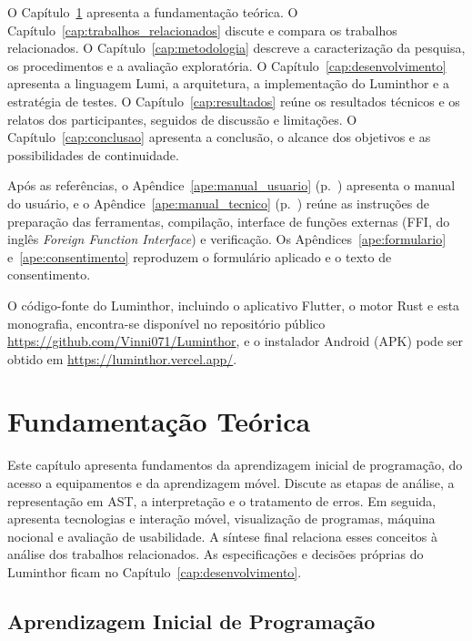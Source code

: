 \documentclass[
    12pt
    ,oneside
    ,a4paper
    ,chapter=TITLE
    ,section=TITLE
    ,sumario=abnt-6027-2012]{abntex2}
\begin{document}
O Capítulo~\ref{cap:fundamentacao} apresenta a fundamentação teórica.
O Capítulo~\ref{cap:trabalhos_relacionados} discute e compara os trabalhos
relacionados. O Capítulo~\ref{cap:metodologia} descreve a caracterização da
pesquisa, os procedimentos e a avaliação exploratória. O
Capítulo~\ref{cap:desenvolvimento} apresenta a linguagem Lumi, a arquitetura,
a implementação do Luminthor e a estratégia de testes.
O Capítulo~\ref{cap:resultados} reúne os resultados técnicos e os relatos dos
participantes, seguidos de discussão e limitações.
O Capítulo~\ref{cap:conclusao} apresenta a conclusão, o alcance dos objetivos
e as possibilidades de continuidade.

Após as referências, o Apêndice~\ref{ape:manual_usuario}
(p.~\pageref{ape:manual_usuario}) apresenta o manual do usuário, e o
Apêndice~\ref{ape:manual_tecnico} (p.~\pageref{ape:manual_tecnico}) reúne as
instruções de preparação das ferramentas, compilação, interface de funções externas (FFI, do inglês \textit{Foreign Function Interface}) e verificação.
Os Apêndices~\ref{ape:formulario} e~\ref{ape:consentimento} reproduzem o
formulário aplicado e o texto de consentimento.

O código-fonte do Luminthor, incluindo o aplicativo Flutter, o motor Rust e esta
monografia, encontra-se disponível no repositório público
\url{https://github.com/Vinni071/Luminthor}, e o instalador Android (APK) pode ser
obtido em \url{https://luminthor.vercel.app/}.

\chapter{Fundamentação Teórica}
\label{cap:fundamentacao}

Este capítulo apresenta fundamentos da aprendizagem inicial de programação,
do acesso a equipamentos e da aprendizagem móvel. Discute as etapas de análise,
a representação em AST, a interpretação e o tratamento de erros. Em seguida,
apresenta tecnologias e interação móvel, visualização de programas, máquina
nocional e avaliação de usabilidade. A síntese final relaciona esses
conceitos à análise dos trabalhos relacionados. As especificações e decisões
próprias do Luminthor ficam no Capítulo~\ref{cap:desenvolvimento}.

\section{Aprendizagem Inicial de Programação}
\end{document}
